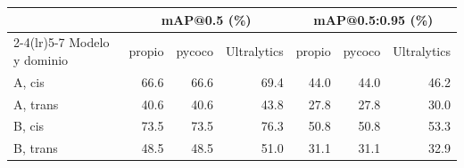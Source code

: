 \begin{tabular}{lrrrrrr}
\toprule
 & \multicolumn{3}{c}{mAP@0.5 (\%)} & \multicolumn{3}{c}{mAP@0.5:0.95 (\%)} \\ \cmidrule(lr){2-4}\cmidrule(lr){5-7}
Modelo y dominio & propio & pycoco & Ultralytics & propio & pycoco & Ultralytics \\
\midrule
A, cis & 66.6 & 66.6 & 69.4 & 44.0 & 44.0 & 46.2 \\
A, trans & 40.6 & 40.6 & 43.8 & 27.8 & 27.8 & 30.0 \\
B, cis & 73.5 & 73.5 & 76.3 & 50.8 & 50.8 & 53.3 \\
B, trans & 48.5 & 48.5 & 51.0 & 31.1 & 31.1 & 32.9 \\
\bottomrule
\end{tabular}
